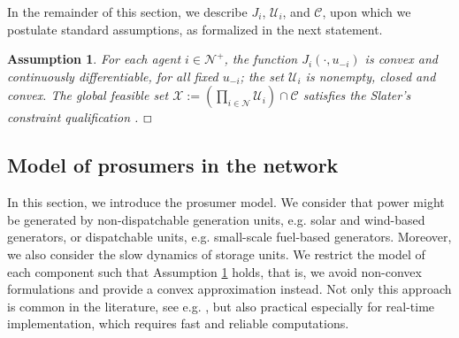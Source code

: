 \documentclass{IEEEtran}  %
\newtheorem{assumption}{Assumption}
\newcommand{\eod}{\ensuremath{\hfill\Box}}
\newcommand{\bs}{\boldsymbol}
\newcommand{\mc}{\mathcal}
\newcommand{\0}{\mathbf{0}}
\newcommand{\1}{\mathbf{1}}
\begin{document}
\smallskip
In the remainder of this section, we describe $J_i$, $\mc U_i$, and $\mc C$, upon which we postulate standard assumptions, as formalized in the next statement.

\smallskip
\begin{assumption}
	\label{as:gen}
For each agent $i\in \mc N^+$, the function $J_i(\cdot,u_{-i})$ is convex and continuously differentiable, for all fixed $u_{-i}$; the set $\mc U_i$ is nonempty, closed and convex. The global feasible set $\bs {\mc X}:=\left( \prod_{i \in \mc N} \mc U_i \right) \cap \mc C $ satisfies the Slater's constraint qualification \cite[Eq. (27.50)]{bauschke2011convex}.  \eod
\end{assumption}
\smallskip

\subsection{Model of prosumers in the network}
\label{sec:mod_comp}
In this section, we introduce the prosumer model. We consider that power might be generated by non-dispatchable generation units, e.g. solar and wind-based generators, or dispatchable units, e.g. small-scale fuel-based generators.
%
Moreover, we also consider the slow dynamics of storage units. We restrict the model of each component such that Assumption \ref{as:gen} holds, that is, we avoid non-convex formulations and provide a convex approximation instead. Not only this approach is common in the literature, see e.g.   \cite{moret2020,atzeni2013,molzahn2017}, but also practical especially for real-time implementation, which requires fast and reliable computations.
 
\end{document}
